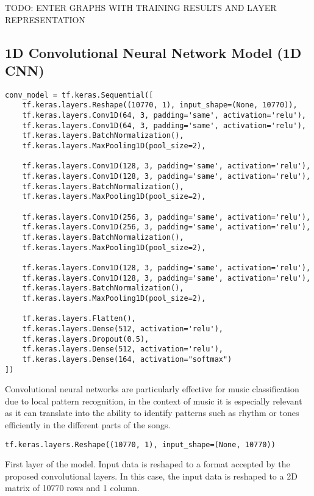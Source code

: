 TODO: ENTER GRAPHS WITH TRAINING RESULTS AND LAYER REPRESENTATION

\newpage

\subsection{1D Convolutional Neural Network Model (1D CNN)}

\begin{verbatim}
conv_model = tf.keras.Sequential([
    tf.keras.layers.Reshape((10770, 1), input_shape=(None, 10770)),
    tf.keras.layers.Conv1D(64, 3, padding='same', activation='relu'),
    tf.keras.layers.Conv1D(64, 3, padding='same', activation='relu'),
    tf.keras.layers.BatchNormalization(),
    tf.keras.layers.MaxPooling1D(pool_size=2),

    tf.keras.layers.Conv1D(128, 3, padding='same', activation='relu'),
    tf.keras.layers.Conv1D(128, 3, padding='same', activation='relu'),
    tf.keras.layers.BatchNormalization(),
    tf.keras.layers.MaxPooling1D(pool_size=2),

    tf.keras.layers.Conv1D(256, 3, padding='same', activation='relu'),
    tf.keras.layers.Conv1D(256, 3, padding='same', activation='relu'),
    tf.keras.layers.BatchNormalization(),
    tf.keras.layers.MaxPooling1D(pool_size=2),

    tf.keras.layers.Conv1D(128, 3, padding='same', activation='relu'),
    tf.keras.layers.Conv1D(128, 3, padding='same', activation='relu'),
    tf.keras.layers.BatchNormalization(),
    tf.keras.layers.MaxPooling1D(pool_size=2),

    tf.keras.layers.Flatten(),
    tf.keras.layers.Dense(512, activation='relu'),
    tf.keras.layers.Dropout(0.5),
    tf.keras.layers.Dense(512, activation='relu'),
    tf.keras.layers.Dense(164, activation="softmax")
])
\end{verbatim}

Convolutional neural networks are particularly effective for music classification due to local pattern recognition, in the context of music it is especially relevant as it can translate into the ability to identify patterns such as rhythm or tones efficiently in the different parts of the songs.

\texttt{tf.keras.layers.Reshape((10770, 1), input\_shape=(None, 10770))}

First layer of the model. Input data is reshaped to a format accepted by the proposed convolutional layers. In this case, the input data is reshaped to a 2D matrix of 10770 rows and 1 column.

